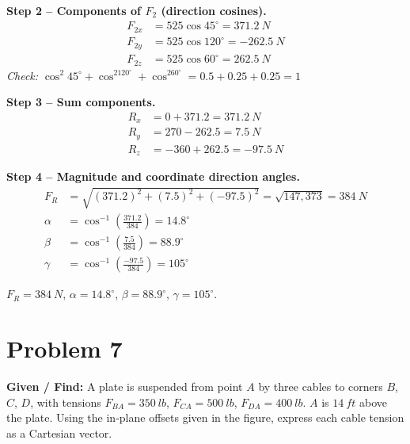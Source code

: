 \documentclass[11pt]{article}
\newcommand{\eqlabel}[1]{\textbf{#1}}
\begin{document}
\eqlabel{Step 2 -- Components of $F_2$ (direction cosines).}
\begin{align*}
    F_{2x} &= 525\cos45^\circ = \SI{371.2}{N} \\
    F_{2y} &= 525\cos120^\circ = \SI{-262.5}{N} \\
    F_{2z} &= 525\cos60^\circ = \SI{262.5}{N}
\end{align*}
\emph{Check:} $\cos^2 45^\circ+\cos^2120^\circ+\cos^260^\circ = 0.5+0.25+0.25=1$ \checkmark

\eqlabel{Step 3 -- Sum components.}
\begin{align*}
    R_x &= 0+371.2 = \SI{371.2}{N} \\
    R_y &= 270-262.5 = \SI{7.5}{N} \\
    R_z &= -360+262.5 = \SI{-97.5}{N}
\end{align*}

\eqlabel{Step 4 -- Magnitude and coordinate direction angles.}
\begin{align*}
    F_R &= \sqrt{(371.2)^2+(7.5)^2+(-97.5)^2} = \sqrt{147{,}373} = \SI{384}{N} \\
    \alpha &= \cos^{-1}\!\left(\frac{371.2}{384}\right) = 14.8^\circ \\
    \beta &= \cos^{-1}\!\left(\frac{7.5}{384}\right) = 88.9^\circ \\
    \gamma &= \cos^{-1}\!\left(\frac{-97.5}{384}\right) = 105^\circ
\end{align*}

\begin{finalanswer}
    $F_R = \SI{384}{N}$, \quad $\alpha = 14.8^\circ$, \quad $\beta = 88.9^\circ$, \quad $\gamma = 105^\circ$.
\end{finalanswer}

\clearpage
\section*{Problem 7}

\textbf{Given / Find:} A plate is suspended from point $A$ by three cables to corners $B$, $C$, $D$, with tensions $F_{BA}=\SI{350}{lb}$, $F_{CA}=\SI{500}{lb}$, $F_{DA}=\SI{400}{lb}$. $A$ is $\SI{14}{ft}$ above the plate. Using the in-plane offsets given in the figure, express each cable tension as a Cartesian vector.
\end{document}
